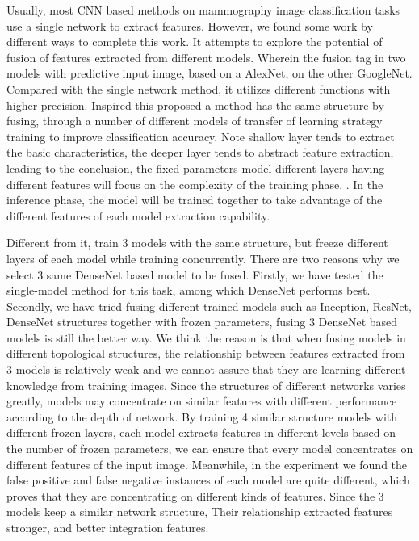 Usually, most CNN based methods on mammography 
image classification tasks use a single network 
to extract features. 
However, we found some work by different ways to 
complete this work.
It attempts to explore the potential of fusion 
of features extracted from different models. 
Wherein the fusion tag in two models with 
predictive input image, based on a AlexNet, on 
the other GoogleNet. 
Compared with the single network method, it 
utilizes different functions with higher 
precision.
Inspired this proposed a method has the same 
structure by fusing, through a number of 
different models of transfer of learning 
strategy training to improve classification 
accuracy.
Note shallow layer tends to extract the basic 
characteristics, the deeper layer tends to 
abstract feature extraction, leading to the 
conclusion, the fixed parameters model 
different layers having different features will 
focus on the complexity of the training phase.
\cite{Ciresan2012}.
In the inference phase, the model will be 
trained together to take advantage of the 
different features of each model extraction 
capability.

Different from it, train 3 models with 
the same structure, but freeze different 
layers of each model while training 
concurrently. There are two reasons why we 
select 3 same DenseNet based model to be fused. 
Firstly, we have tested the single-model 
method for this task, among which DenseNet
performs best. Secondly, we have tried fusing 
different trained models such as Inception, 
ResNet, DenseNet structures together with frozen 
parameters, fusing 3 DenseNet based models 
is still the better way. We think the reason 
is that when fusing models in different 
topological structures, the relationship 
between features extracted from 3 models is 
relatively weak and we cannot assure that 
they are learning different knowledge from 
training images. Since the structures of 
different networks varies greatly, models may
concentrate on similar features with different 
performance according to the depth of network. 
By training 4 similar structure models with 
different frozen layers, each model extracts 
features in different levels based on the 
number of frozen parameters, we can ensure 
that every model concentrates on different 
features of the input image. Meanwhile, in
the experiment we found the false positive 
and false negative instances of each model 
are quite different, which proves that they 
are concentrating on different kinds of 
features. Since the 3 models keep a similar 
network structure, Their relationship 
extracted features stronger, and better 
integration features.

